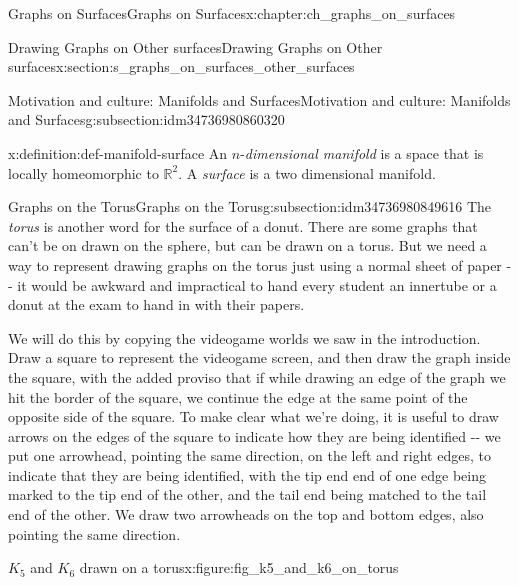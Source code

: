 \documentclass[oneside,10pt,]{book}
\numberwithin{equation}{section}
\newcommand{\reals}{\mathbb{R}}
\begin{document}
\begin{chapterptx}{Graphs on Surfaces}{}{Graphs on Surfaces}{}{}{x:chapter:ch_graphs_on_surfaces}
\begin{sectionptx}{Drawing Graphs on Other surfaces}{}{Drawing Graphs on Other surfaces}{}{}{x:section:s_graphs_on_surfaces_other_surfaces}
\begin{subsectionptx}{Motivation and culture: Manifolds and Surfaces}{}{Motivation and culture: Manifolds and Surfaces}{}{}{g:subsection:idm34736980860320}
\begin{definition}{}{x:definition:def-manifold-surface}
An \(n\)-\emph{dimensional manifold} is a space that is locally homeomorphic to \(\reals^2\).  A \emph{surface} is a two dimensional manifold.%
\end{definition}
\end{subsectionptx}
%
%
\typeout{************************************************}
\typeout{************************************************}
%
\begin{subsectionptx}{Graphs on the Torus}{}{Graphs on the Torus}{}{}{g:subsection:idm34736980849616}
The \emph{torus} is another word for the surface of a donut.  There are some graphs that can't be on drawn on the sphere, but can be drawn on a torus.  But we need a way to represent drawing graphs on the torus just using a normal sheet of paper -{}-{} it would be awkward and impractical to hand every student an innertube or a donut at the exam to hand in with their papers.%
\par
We will do this by copying the videogame worlds we saw in the introduction.  Draw a square to represent the videogame screen, and then draw the graph inside the square, with the added proviso that if while drawing an edge of the graph we hit the border of the square, we continue the edge at the same point of the opposite side of the square.  To make clear what we're doing, it is useful to draw arrows on the edges of the square to indicate how they are being identified -{}-{} we put one arrowhead, pointing the same direction, on the left and right edges, to indicate that they are being identified, with the tip end end of one edge being marked to the tip end of the other, and the tail end being matched to the tail end of the other.  We draw two arrowheads on the top and bottom edges, also pointing the same direction.%
\begin{figureptx}{\(K_5\) and \(K_6\)  drawn on a torus}{x:figure:fig_k5_and_k6_on_torus}{}%
\begin{image}{0}{1}{0}%
\resizebox{\linewidth}{!}{%
\begin{tikzpicture}


\end{tikzpicture}}
\end{image}
\end{figureptx}
\end{subsectionptx}
\end{sectionptx}
\end{chapterptx}
\end{document}
